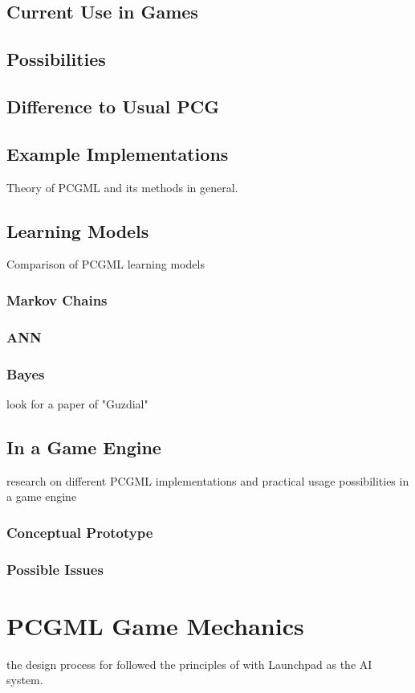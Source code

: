 \documentclass[MGS,Master,english]{twbook}%
\begin{document}
\section{Current Use in Games}
\section{Possibilities}
\section{Difference to Usual \acl{PCG}}
\section{Example Implementations}
Theory of PCGML and its methods in general.
\section{Learning Models}
Comparison of PCGML learning models
\subsection{Markov Chains}
\subsection{\acl{ANN}}
\subsection{Bayes}
look for a paper of "Guzdial"
\section{In a Game Engine}
research on different PCGML implementations and practical usage possibilities in a game engine
\subsection{Conceptual Prototype}
\subsection{Possible Issues}
%
%
\clearpage
\chapter{\acl{PCGML} Game Mechanics}
the design process for \cite{pcg::endlessWeb} followed the principles of \cite{ai::gameDesign} with Launchpad as the AI system.
\end{document}
